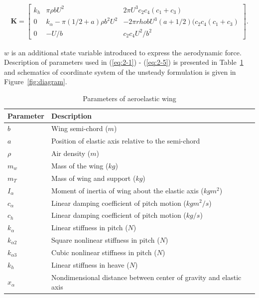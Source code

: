 \documentclass[openacc]{rsproca_new}%
\theoremstyle{own}
\def\vec#1{\ensuremath{\mathbf{#1}}}
\newcommand{\Eref}[1]{(\ref{#1})}
\newcommand{\Fref}[1]{Figure~\ref{#1}}
\newcommand{\Tref}[1]{Table~\ref{#1}}
\begin{document}
\begin{align}\label{eq:2-5}
\vec K=
\begin{bmatrix}
      k_h        & \pi \rho b U^2  & 2 \pi U^3 c_2 c_4 (c_1+c_3) \\
      0         & k_\alpha - \pi (1/2+a)\rho b^2 U^2 & -2 \pi rho b U^3 (a+1/2)(c_2c_4(c_1+c_3) \\
      0       & -U/b & c_2 c_4U^2/b^2
\end{bmatrix}.
\end{align}

\noindent $w$ is an additional state variable introduced to express the aerodynamic force. Description of parameters used in \Eref{eq:2-1} - \Eref{eq:2-5} is presented in \Tref{wing_par} and schematics of coordinate system of the unsteady formulation is given in \Fref{fig:diagram}.

\begin{table}[!ht]
\caption{Parameters of aeroelastic wing}
\label{wing_par}
\begin{tabular}{ll}%
\hline
Parameter &Description \\
\hline
$b$ & Wing semi-chord ($m$) \\
$a$ & Position of elastic axis relative to the semi-chord  \\
$\rho$ & Air density ($m$) \\
$m_w$ & Mass of the wing ($kg$) \\
$m_T$ & Mass of wing and support ($kg$) \\
$I_\alpha$ & Moment of inertia of wing about the elastic axis ($kg m^2$) \\
$c_\alpha$ & Linear damping coefficient of pitch motion ($kg m^2/s$) \\
$c_h$ & Linear damping coefficient of pitch motion ($kg/s$) \\
$k_\alpha$ & Linear stiffness in pitch ($N$) \\
$k_{\alpha 2}$ & Square nonlinear stiffness in pitch  ($N$) \\
$k_{\alpha 3}$ & Cubic nonlinear stiffness in pitch ($N$) \\
$k_{h}$ & Linear stiffness in heave ($N$) \\
$x_\alpha$ & Nondimensional distance between center of gravity and elastic axis  \\
\hline
\end{tabular}
\vspace*{-4pt}
\end{table}%
\end{document}
